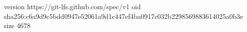 version https://git-lfs.github.com/spec/v1
oid sha256:c6a9d9c5bdd0947e52061a9d1c447ef4ba0917c032b2298569883614025a0b3e
size 4678
